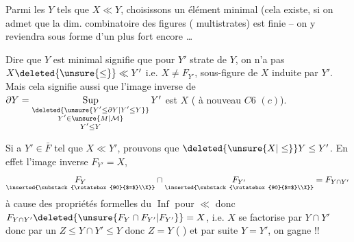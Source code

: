 
Parmi les $Y$ tels que $X\ll Y$, choisissons un élément minimal (cela existe, si on admet que la dim. combinatoire des figures  ( multistrates) est finie -- on y reviendra sous forme d'un  plus fort encore \ldots\ 

Dire que $Y$ est minimal signifie que pour $Y'$ strate de $Y$, on n'a pas $X\deleted{\unsure{\leq}}\ll Y'$ i.e. $X\neq F_{Y'}$, sous-figure de $X$ induite par $Y'$. Mais cela signifie aussi que l'image inverse de $\partial Y=\mathop{\mathrm{Sup}}\limits_{\substack{\deleted{\unsure{Y'\leq\partial Y|Y'\leq Y}}\\Y'\in\unsure{M|\mathcal M}\\Y'\leq Y}}Y'$ est   $X$ ( à nouveau $C6$ $(c)$). 

Si  a $Y'\in\bar F$ tel que $X\ll Y'$, prouvons que $\deleted{\unsure{X|\leq}}Y\leq Y'$.  En  effet l'image inverse $F_{Y'}=X$, 
\[
 \underset{\inserted{\substack{\rotatebox{90}{$=$}\\X}}}{F_Y}\cap
 \underset{\inserted{\substack{\rotatebox{90}{$=$}\\X}}}{F_{Y'}}=F_{Y\cap Y'}
\]
à cause des propriétés formelles du $\operatorname{Inf}$ pour $\ll$ donc $F_{Y\cap Y'}\deleted{\unsure{F_Y\cap F_{Y'}|F_{Y'}}}=X$, i.e. $X$ se factorise par $Y\cap Y'$ donc par un $Z\leq Y\cap Y'\leq Y$ donc $Z=Y$ ( ) et par suite $Y=Y'$, on gagne !!
